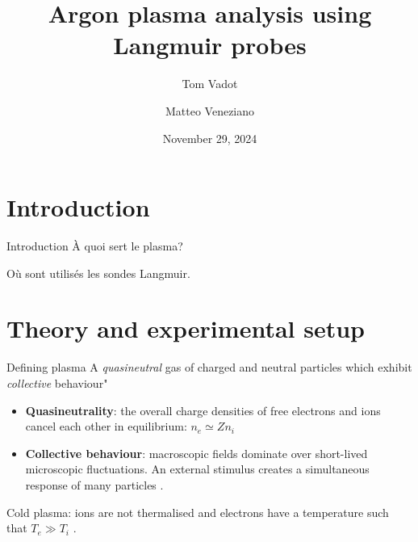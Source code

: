 \documentclass[10pt]{beamer}
\title[(À enlever)]{Argon plasma analysis using Langmuir probes}
\author[Tom Vadot \and Matteo Veneziano]{Tom Vadot \and Matteo Veneziano}
\institute[]{EPFL Section of Physics}
\date{November 29, 2024}
\begin{document}
\begin{frame}
    \titlepage
\end{frame}

\section{Introduction}
\begin{frame}{Introduction}
    À quoi sert le plasma?

    Où sont utilisés les sondes Langmuir.
\end{frame}

\section{Theory and experimental setup}
\begin{frame}{Defining plasma}
    A \emph{quasineutral} gas of charged and neutral particles which exhibit \emph{collective} behaviour" 
    \vspace{0.5cm}
    \begin{itemize}
        \item \textbf{Quasineutrality}: the overall charge densities of free electrons and ions cancel each other in equilibrium: 
            $n_e \simeq Z n_i$ 

        \item \textbf{Collective behaviour}: macroscopic fields dominate over short-lived microscopic fluctuations.
            An external stimulus creates a simultaneous response of many particles .
    \end{itemize}
    \vspace{0.5cm}
    Cold plasma: ions are not thermalised and electrons have a temperature such that $T_e \gg T_i$ .
\end{frame}
\end{document}
